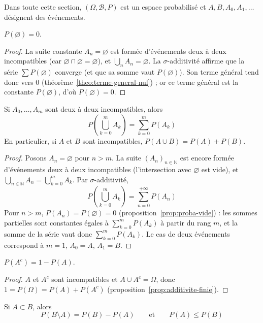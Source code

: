 Dans toute cette section, $(\Omega,\mathcal{B},P)$ est un espace probabilisé et $A,B,A_0,A_1,\dots$ désignent des événements.

\begin{prop}
\label{prop:proba-vide}
$P(\varnothing)=0$.
\end{prop}

\begin{proof}
La suite constante $A_n=\varnothing$ est formée d'événements deux à deux incompatibles (car $\varnothing\cap\varnothing=\varnothing$), et $\bigcup_nA_n=\varnothing$. La $\sigma$-additivité affirme que la série $\sum P(\varnothing)$ converge (et que sa somme vaut $P(\varnothing)$). Son terme général tend donc vers $0$ (théorème~\ref{theo:terme-general-nul}) ; or ce terme général est la constante $P(\varnothing)$, d'où $P(\varnothing)=0$.
\end{proof}

\begin{prop}
\label{prop:additivite-finie}
Si $A_0,\dots,A_m$ sont deux à deux incompatibles, alors
\[P\left(\bigcup_{k=0}^{m}A_k\right)=\sum_{k=0}^{m}P(A_k)\]
En particulier, si $A$ et $B$ sont incompatibles, $P(A\cup B)=P(A)+P(B)$.
\end{prop}

\begin{proof}
Posons $A_n=\varnothing$ pour $n>m$. La suite $(A_n)_{n\in\mathbb{N}}$ est encore formée d'événements deux à deux incompatibles (l'intersection avec $\varnothing$ est vide), et $\bigcup_{n\in\mathbb{N}}A_n=\bigcup_{k=0}^mA_k$. Par $\sigma$-additivité,
\[P\left(\bigcup_{k=0}^{m}A_k\right)=\sum_{n=0}^{+\infty}P(A_n)\]
Pour $n>m$, $P(A_n)=P(\varnothing)=0$ (proposition~\ref{prop:proba-vide}) : les sommes partielles sont constantes égales à $\sum_{k=0}^mP(A_k)$ à partir du rang $m$, et la somme de la série vaut donc $\sum_{k=0}^mP(A_k)$. Le cas de deux événements correspond à $m=1$, $A_0=A$, $A_1=B$.
\end{proof}

\begin{prop}
\label{prop:proba-complementaire}
$P(A^c)=1-P(A)$.
\end{prop}

\begin{proof}
$A$ et $A^c$ sont incompatibles et $A\cup A^c=\Omega$, donc $1=P(\Omega)=P(A)+P(A^c)$ (proposition~\ref{prop:additivite-finie}).
\end{proof}

\begin{prop}
\label{prop:proba-croissance}
Si $A\subset B$, alors
\[P(B\setminus A)=P(B)-P(A)\qquad\text{et}\qquad P(A)\leq P(B)\]
\end{prop}

